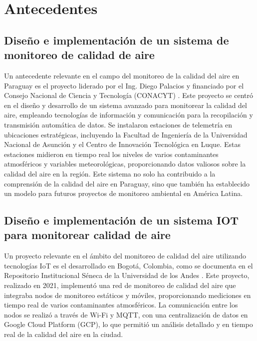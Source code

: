 \section{Antecedentes}

\subsection{Diseño e implementación de un sistema de monitoreo de calidad de aire}
Un antecedente relevante en el campo del monitoreo de la calidad del aire en Paraguay es el proyecto liderado por el Ing. Diego Palacios y financiado por el Consejo Nacional de Ciencia y Tecnología (CONACYT) \cite{sistema_de_monitoreo}. Este proyecto se centró en el diseño y desarrollo de un sistema avanzado para monitorear la calidad del aire, empleando tecnologías de información y comunicación para la recopilación y transmisión automática de datos. Se instalaron estaciones de telemetría en ubicaciones estratégicas, incluyendo la Facultad de Ingeniería de la Universidad Nacional de Asunción y el Centro de Innovación Tecnológica en Luque. Estas estaciones midieron en tiempo real los niveles de varios contaminantes atmosféricos y variables meteorológicas, proporcionando datos valiosos sobre la calidad del aire en la región. Este sistema no solo ha contribuido a la comprensión de la calidad del aire en Paraguay, sino que también ha establecido un modelo para futuros proyectos de monitoreo ambiental en América Latina.

\subsection{Diseño e implementación de un sistema IOT para monitorear calidad de aire}
Un proyecto relevante en el ámbito del monitoreo de calidad del aire utilizando tecnologías IoT es el desarrollado en Bogotá, Colombia, como se documenta en el Repositorio Institucional Séneca de la Universidad de los Andes \cite{Sistema_IOT_monitoreo}. Este proyecto, realizado en 2021, implementó una red de monitoreo de calidad del aire que integraba nodos de monitoreo estáticos y móviles, proporcionando mediciones en tiempo real de varios contaminantes atmosféricos. La comunicación entre los nodos se realizó a través de Wi-Fi y MQTT, con una centralización de datos en Google Cloud Platform (GCP), lo que permitió un análisis detallado y en tiempo real de la calidad del aire en la ciudad.

